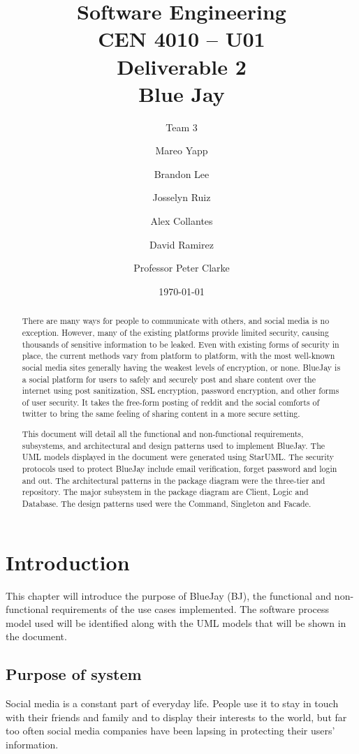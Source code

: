 \documentclass{report}
\begin{document}
\title{Software Engineering\\CEN 4010 – U01\\Deliverable 2\\Blue Jay}
\date{\today}
\author{Team 3\and Mareo Yapp\and Brandon Lee\and Josselyn Ruiz\and Alex Collantes\and David Ramirez\and Professor Peter Clarke}
\maketitle

\begin{abstract}
There are many ways for people to communicate with others,
and social media is no exception. However,
many of the existing platforms provide limited security,
causing thousands of sensitive information to be leaked.
Even with existing forms of security in place,
the current methods vary from platform to platform,
with the most well-known social media sites generally having the weakest levels of encryption, or none.
BlueJay is a social platform for users to safely and securely post and share content over the internet using post sanitization,
SSL encryption, password encryption, and other forms of user security.
It takes the free-form posting of reddit and the social comforts of twitter to bring the same feeling of sharing content in a more secure setting.

This document will detail all the functional and non-functional requirements,
subsystems, and architectural and design patterns used to implement BlueJay.
The UML models displayed in the document were generated using StarUML.
The security protocols used to protect BlueJay include email verification,
forget password and login and out.
The architectural patterns in the package diagram were the three-tier and repository.
The major subsystem in the package diagram are Client, Logic and Database.
The design patterns used were the Command, Singleton and Facade.
\end{abstract}
 
\tableofcontents

\chapter{Introduction}
	This chapter will introduce the purpose of BlueJay (BJ),
	the functional and non-functional requirements of the use cases implemented.
	The software process model used will be identified along with the UML models that will be shown in the document.
\section{Purpose of system}
	Social media is a constant part of everyday life.
	People use it to stay in touch with their friends and family and to display their interests to the world,
	but far too often social media companies have been lapsing in protecting their users’ information.
\end{document}
